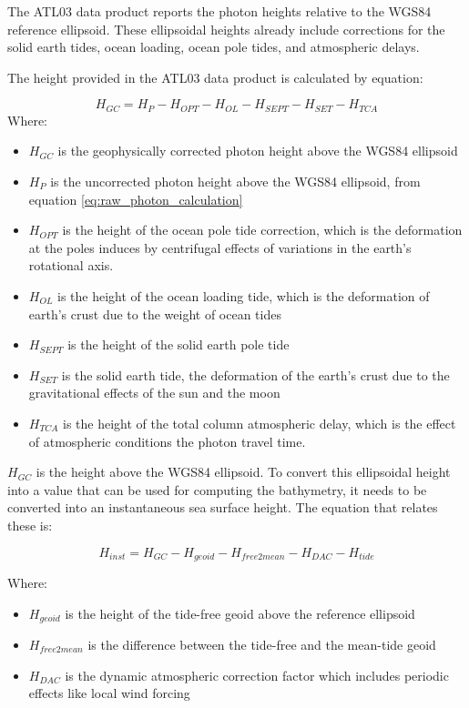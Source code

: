 The ATL03 data product reports the photon heights relative to the WGS84 reference ellipsoid. These ellipsoidal heights already include corrections for the solid earth tides, ocean loading, ocean pole tides, and atmospheric delays.

The height provided in the ATL03 data product is calculated by equation:

\begin{equation}
      H_{GC} =  H_{P} - H_{OPT} - H_{OL} - H_{SEPT} - H_{SET} - H_{TCA}
\end{equation}
Where:

\begin{itemize}
      \item \(H_{GC}\) is the geophysically corrected photon height above the WGS84 ellipsoid
      \item \(H_{P}\) is the uncorrected photon height above the WGS84 ellipsoid, from equation \ref{eq:raw_photon_calculation}
      \item \(H_{OPT}\) is the height of the ocean pole tide correction, which is the deformation at the poles induces by centrifugal effects of variations in the earth's rotational axis.
      \item \(H_{OL}\) is the height of the ocean loading tide, which is the deformation of earth's crust due to the weight of ocean tides
      \item \(H_{SEPT}\) is the height of the solid earth pole tide
      \item \(H_{SET}\) is the solid earth tide, the deformation of the earth's crust due to the gravitational effects of the sun and the moon
      \item \(H_{TCA}\) is the height of the total column atmospheric delay, which is the effect of atmospheric conditions the photon travel time.
\end{itemize}

$H_{GC}$ is the height above the WGS84 ellipsoid. To convert this ellipsoidal height into a value that can be used for computing the bathymetry, it needs to be converted into an instantaneous sea surface height. The equation that relates these is:

\begin{equation}
      H_{inst} = H_{GC} - H_{geoid} - H_{free2mean} - H_{DAC} - H_{tide}
\end{equation}

Where:
\begin{itemize}
      \item $H_{geoid}$ is the height of the tide-free geoid above the reference ellipsoid
      \item $H_{free2mean}$ is the difference between the tide-free and the mean-tide geoid
      \item $H_{DAC}$ is the dynamic atmospheric correction factor which includes periodic effects like local wind forcing
\end{itemize}

